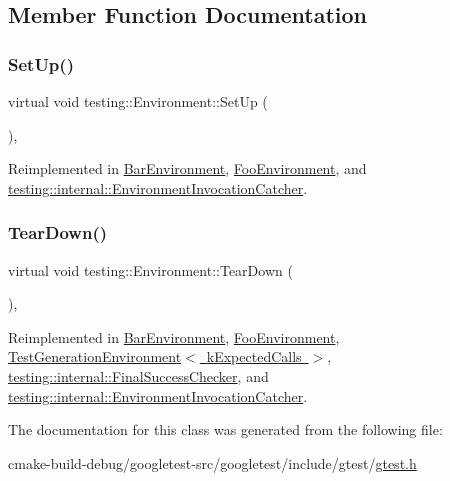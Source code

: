 \subsection{Member Function Documentation}
\mbox{\label{classtesting_1_1Environment_a1bf8cafaa9d4eba9feb98655ee434eb3}} 
\subsubsection{\texorpdfstring{SetUp()}{SetUp()}}
{\footnotesize\ttfamily virtual void testing\+::\+Environment\+::\+Set\+Up (\begin{DoxyParamCaption}{ }\end{DoxyParamCaption})\hspace{0.3cm}{\ttfamily [inline]}, {\ttfamily [virtual]}}



Reimplemented in \mbox{\hyperlink{classBarEnvironment_a88e17c5dd1dcea7a4538f2f3c6bf7bdd}{Bar\+Environment}}, \mbox{\hyperlink{classFooEnvironment_a7db8d8b312805aff437ae8534132a56d}{Foo\+Environment}}, and \mbox{\hyperlink{classtesting_1_1internal_1_1EnvironmentInvocationCatcher_a325365b0ecfa71a4a767d7a1817c9663}{testing\+::internal\+::\+Environment\+Invocation\+Catcher}}.

\mbox{\label{classtesting_1_1Environment_a039bdaa705c46b9b88234cf4d3bb6254}} 
\subsubsection{\texorpdfstring{TearDown()}{TearDown()}}
{\footnotesize\ttfamily virtual void testing\+::\+Environment\+::\+Tear\+Down (\begin{DoxyParamCaption}{ }\end{DoxyParamCaption})\hspace{0.3cm}{\ttfamily [inline]}, {\ttfamily [virtual]}}



Reimplemented in \mbox{\hyperlink{classBarEnvironment_a384f951da72a2a18bb0c2b3506376b09}{Bar\+Environment}}, \mbox{\hyperlink{classFooEnvironment_a99a2c9df52106cce9e7a4bdda53df802}{Foo\+Environment}}, \mbox{\hyperlink{classTestGenerationEnvironment_ac3787d8afb43b97b0b3d6dec78b04798}{Test\+Generation\+Environment$<$ k\+Expected\+Calls $>$}}, \mbox{\hyperlink{classtesting_1_1internal_1_1FinalSuccessChecker_a8f39d12a1f2bfe8c6c04b5c6749382c9}{testing\+::internal\+::\+Final\+Success\+Checker}}, and \mbox{\hyperlink{classtesting_1_1internal_1_1EnvironmentInvocationCatcher_afc89ee0a8e32e6746a89fcc1682f62e9}{testing\+::internal\+::\+Environment\+Invocation\+Catcher}}.



The documentation for this class was generated from the following file\+:\begin{DoxyCompactItemize}
\item 
cmake-\/build-\/debug/googletest-\/src/googletest/include/gtest/\mbox{\hyperlink{gtest_8h}{gtest.\+h}}\end{DoxyCompactItemize}

